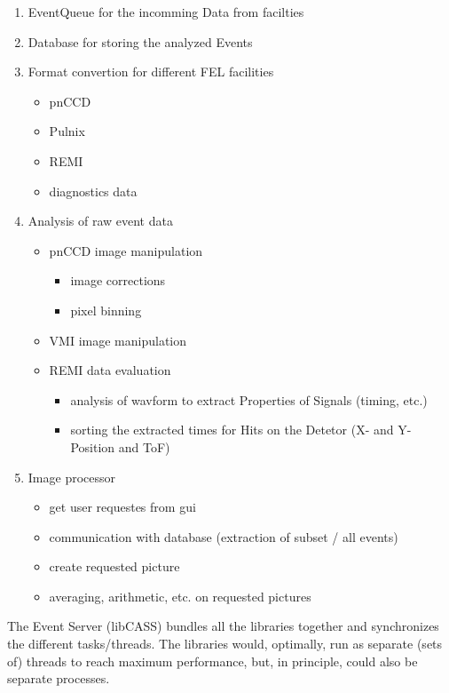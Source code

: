 \documentclass[11pt,a4paper,oneside]{article}
\begin{document}
\begin{enumerate}
	\item EventQueue for the incomming Data from facilties
	\item Database for storing the analyzed Events
	\item Format convertion for different FEL facilities
		\begin{itemize}
		\item pnCCD
		\item Pulnix
		\item REMI
		\item diagnostics data
		\end{itemize}
 	\item Analysis of raw event data
		\begin{itemize}
   		\item pnCCD image manipulation
      		\begin{itemize}
      		\item image corrections
     		\item pixel binning
      		\end{itemize}
   		\item VMI image manipulation
   		\item REMI data evaluation
 	  		\begin{itemize}
 	  		\item analysis of wavform to extract Properties of Signals (timing, etc.)
 	  		\item sorting the extracted times for Hits on the Detetor (X- and Y- Position and ToF)
	  		\end{itemize}
  		\end{itemize}
  	\item Image processor
  		\begin{itemize}
  		\item get user requestes from gui
  		\item communication with database (extraction of subset / all events)
  		\item create requested picture
  		\item averaging, arithmetic, etc. on requested pictures
  		\end{itemize}
\end{enumerate}

The Event Server (libCASS) bundles all the libraries together and synchronizes the different tasks/threads. The libraries would, optimally, run as separate (sets of) threads to reach maximum performance, but, in principle, could also be separate processes.
\end{document}
